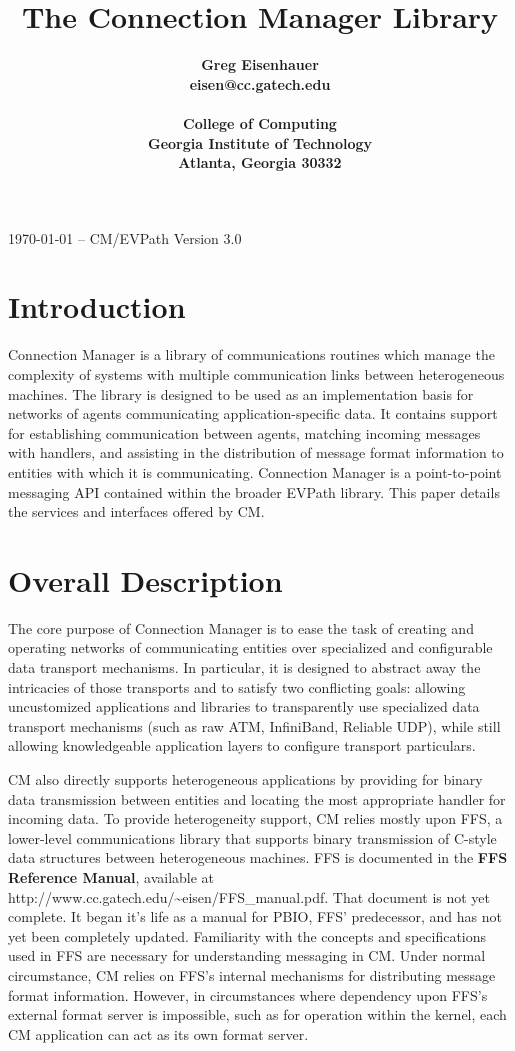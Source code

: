 \documentclass[11pt]{article}
\date{}
\title{The Connection Manager Library}
\author{ 
\large\bf Greg Eisenhauer\\
eisen@cc.gatech.edu\\
\ \\
College of Computing \\
Georgia Institute of Technology \\
Atlanta, Georgia 30332 \\
}
\begin{document}

\maketitle
\begin{center}
\today{} -- CM/EVPath Version 3.0
\end{center}
\section{Introduction}

Connection Manager is a library of communications routines which manage the
complexity of systems with multiple communication links between
heterogeneous machines.  The library is designed to be used as an
implementation basis for networks of agents communicating
application-specific data.  It contains support for establishing communication between agents,
matching incoming messages with handlers, and assisting in the distribution
of message format information to entities with which it is communicating.
Connection Manager is a point-to-point messaging API contained within
the broader EVPath library.  This paper details the services and
interfaces offered by CM.

\section{Overall Description\label{overall}}

The core purpose of Connection Manager is to ease the task of creating and
operating networks of communicating entities over specialized and
configurable data transport mechanisms.  In particular, it is designed to
abstract away the intricacies of those transports and to satisfy two
conflicting goals: allowing uncustomized applications and libraries to
transparently use specialized data transport mechanisms (such as raw
ATM, InfiniBand, Reliable UDP), while still allowing knowledgeable
application layers to configure transport particulars.

CM also directly supports heterogeneous applications by providing for binary
data transmission between entities and locating the most appropriate handler
for incoming data.  To provide heterogeneity support, CM relies mostly
upon FFS, a lower-level communications library that supports binary
transmission of C-style data structures between heterogeneous machines.
FFS is documented in the {\bf FFS Reference Manual}, available at
http://www.cc.gatech.edu/\~{ }eisen/FFS\_manual.pdf.  That document is not
yet complete.  It began it's life as a manual for PBIO, FFS'
predecessor, and has not yet been completely updated.
Familiarity with the concepts
and specifications used in FFS are necessary for understanding messaging in
CM.  Under normal circumstance, CM relies on FFS's internal mechanisms for
distributing message format information.  However, in circumstances where
dependency upon FFS's external format server is impossible, such as for
operation within the kernel, each CM application can act as its own format
server.
\end{document}
